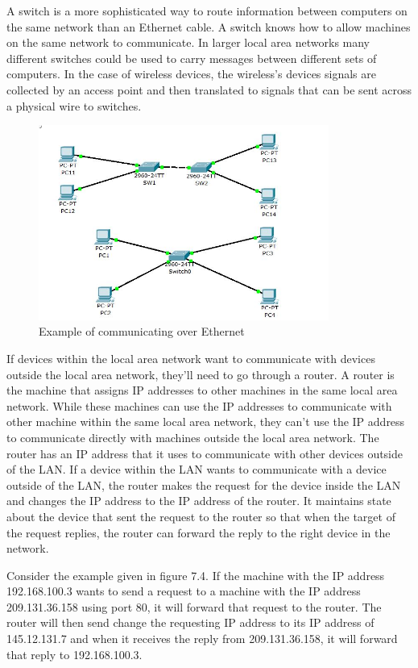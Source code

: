 A switch is a more sophisticated way to route information between computers on the same network than an Ethernet cable. A switch knows how to allow machines on the same network to communicate. In larger local area networks many different switches could be used to carry messages between different sets of computers. In the case of wireless devices, the wireless’s devices signals are collected by an access point and then translated to signals that can be sent across a physical wire to switches.

\begin{figure}
	\centering
	\includegraphics[width=0.85\textwidth]{images/switchExample.png}
	\caption{Example of communicating over Ethernet}
	\label{fig:windows:file}
\end{figure}

If devices within the local area network want to communicate with devices outside the local area network, they’ll need to go through a router. A router is the machine that assigns IP addresses to other machines in the same local area network. While these machines can use the IP addresses to communicate with other machine within the same local area network, they can’t use the IP address to communicate directly with machines outside the local area network. The router has an IP address that it uses to communicate with other devices outside of the LAN. If a device within the LAN wants to communicate with a device outside of the LAN, the router makes the request for the device inside the LAN and changes the IP address to the IP address of the router. It maintains state about the device that sent the request to the router so that when the target of the request replies, the router can forward the reply to the right device in the network.


Consider the example given in figure 7.4. If the machine with the IP address 192.168.100.3 wants to send a request to a machine with the IP address 209.131.36.158 using port 80, it will forward that request to the router. The router will then send change the requesting IP address to its IP address of 145.12.131.7 and when it receives the reply from 209.131.36.158, it will forward that reply to 192.168.100.3.

